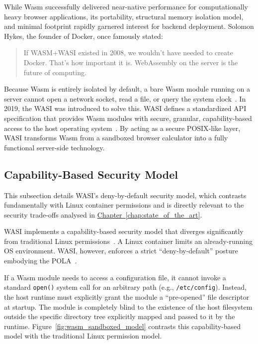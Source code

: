 While \acs{Wasm} successfully delivered near-native performance for computationally heavy browser applications, its portability, structural memory isolation model, and minimal footprint rapidly garnered interest for backend deployment. Solomon Hykes, the founder of Docker, once famously stated:
\begin{quote}
    If WASM+WASI existed in 2008, we wouldn't have needed to create Docker. That's how important it is. WebAssembly on the server is the future of computing.~\cite{hykes2019tweet}
\end{quote}

Because \acs{Wasm} is entirely isolated by default, a bare \acs{Wasm} module running on a server cannot open a network socket, read a file, or query the system clock~\cite{haas2017bringing, webassembly2024corespec}. In 2019, the \acl{WASI} was introduced to solve this. \acs{WASI} defines a standardized \acs{API} specification that provides \acs{Wasm} modules with secure, granular, capability-based access to the host operating system~\cite{clark2019standardizing}. By acting as a secure \acs{POSIX}-like layer, \acs{WASI} transforms \acs{Wasm} from a sandboxed browser calculator into a fully functional server-side technology.

\subsection{Capability-Based Security Model}
This subsection details \acs{WASI}'s deny-by-default security model, which contrasts fundamentally with Linux container permissions and is directly relevant to the security trade-offs analysed in \hyperref[chap:state_of_the_art]{Chapter~\ref{chap:state_of_the_art}}.

\acs{WASI} implements a capability-based security model that diverges significantly from traditional Linux permissions~\cite{clark2019standardizing}. A Linux container limits an already-running \acs{OS} environment. \acs{WASI}, however, enforces a strict ``deny-by-default'' posture embodying the \ac{POLA}~\cite{clark2019standardizing, bytecodealliance2024componentmodel}.

\begin{sloppypar}
If a \acs{Wasm} module needs to access a configuration file, it cannot invoke a standard \texttt{open()} system call for an arbitrary path (e.g., \texttt{/etc/config}). Instead, the host runtime must explicitly grant the module a ``pre-opened'' file descriptor at startup. The module is completely blind to the existence of the host filesystem outside the specific directory tree explicitly mapped and passed to it by the runtime. Figure~\ref{fig:wasm_sandboxed_model} contrasts this capability-based model with the traditional Linux permission model.
\end{sloppypar}

